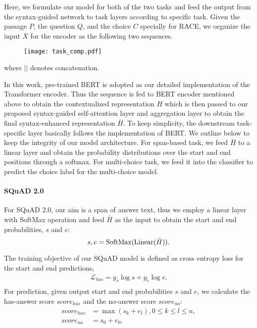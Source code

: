 \documentclass[letterpaper]{article} \usepackage{color}
\begin{document}
Here, we formulate our model for both of the two tasks and feed the output from the syntax-guided network to task layers according to specific task. Given the passage $P$, the question $Q$, and the choice $C$ specially for RACE, we organize the input $X$ for the encoder as the following two sequences.

\begin{figure}[htb]
	\centering
	\texttt{[image: task\_comp.pdf]}
\end{figure}
\noindent where $||$ denotes concatenation. 

In this work, pre-trained BERT is adopted as our detailed implementation of the Transformer encoder. Thus the sequence is fed to BERT encoder mentioned above to obtain the contextualized representation $\textit{H}$ which is then passed to our proposed syntax-guided self-attention layer and aggregation layer to obtain the final syntax-enhanced representation $\bar{H}$. To keep simplicity, the downstream task-specific layer basically follows the implementation of BERT. We outline below to keep the integrity of our model architecture. For span-based task, we feed $\bar{H}$ to a linear layer and obtain the probability distributions over the start and end positions through a softmax. For multi-choice task, we feed it into the classifier to predict the choice label for the multi-choice model.

\paragraph{SQuAD 2.0}
For SQuAD 2.0, our aim is a span of answer text, thus we employ a linear layer with SoftMax operation and feed $\bar H$ as the input to obtain the start and end probabilities, $s$ and $e$:
\begin{equation}
s, e = \textup{SoftMax}(\textup{Linear}(\bar H)).
\end{equation}




The training objective of our SQuAD model is defined as cross entropy loss for the start and end predictions, 
\begin{equation}
\begin{split}
\mathcal{L}_{has} = y_s \log{s} + y_e \log{e}.\\
\end{split}
\end{equation}
For prediction, given output start and end probabilities $s$ and $e$, we calculate the has-answer score $score_{has}$ and the no-answer score $score_{na}$:
\begin{equation}
\begin{split}
score_{has} & =\max (s_k + e_l),0\le k \le l \le n, \\
score_{na} &= s_0+e_0.
\end{split}
\end{equation}
\end{document}
